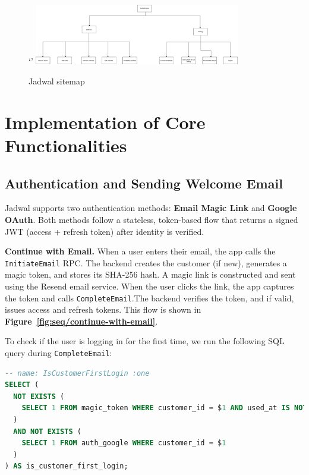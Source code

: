 \begin{figure}[H]`'
    \centering
    \includegraphics[width=0.8\textwidth]{images/JadwalSitemap.drawio.png}
    \caption{Jadwal sitemap }
    \label{fig:architecture-realization}
\end{figure}

\section{Implementation of Core Functionalities}

\subsection{Authentication and Sending Welcome Email} \label{subsec:authentication}

Jadwal supports two authentication methods: \textbf{Email Magic Link} and \textbf{Google OAuth}. Both methods follow a stateless, token-based flow that returns a signed JWT (access + refresh token) after identity is verified.

\textbf{Continue with Email.} When a user enters their email, the app calls the \texttt{InitiateEmail} RPC.
The backend creates the customer (if new), generates a magic token, and stores its SHA-256 hash.
A magic link is constructed and sent using the Resend email service. When the user clicks the link, the app captures the token and calls \texttt{CompleteEmail}.The backend verifies the token, and if valid, issues access and refresh tokens. This flow is shown in \textbf{Figure~\ref{fig:seq/continue-with-email}}.

To check if the user is logging in for the first time, we run the following SQL query during \texttt{CompleteEmail}:

\begin{lstlisting}[language=SQL, caption={Check for First Login}, label={lst:is-first-login}]
-- name: IsCustomerFirstLogin :one
SELECT (
  NOT EXISTS (
    SELECT 1 FROM magic_token WHERE customer_id = $1 AND used_at IS NOT NULL
  )
  AND NOT EXISTS (
    SELECT 1 FROM auth_google WHERE customer_id = $1
  )
) AS is_customer_first_login;
\end{lstlisting}

